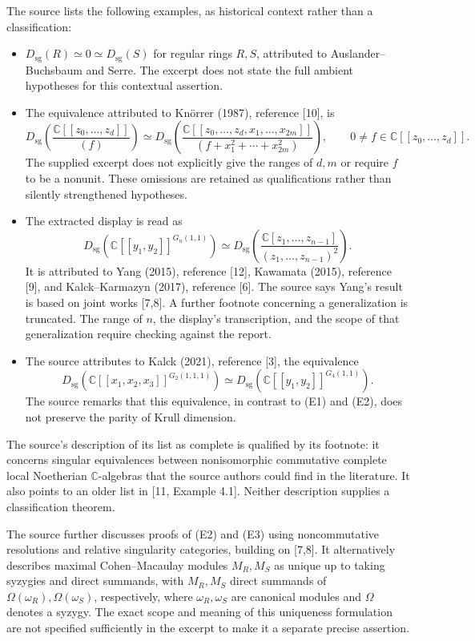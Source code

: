 \documentclass[11pt]{article}
\newcommand{\C}{\mathbb{C}}
\begin{document}
The source lists the following examples, as historical context rather than a classification:
\begin{itemize}
\item[(E0)] \(D_{\mathrm{sg}}(R)\simeq0\simeq D_{\mathrm{sg}}(S)\) for regular rings \(R,S\), attributed to Auslander--Buchsbaum and Serre. The excerpt does not state the full ambient hypotheses for this contextual assertion.
\item[(E1)] The equivalence attributed to Kn\"orrer (1987), reference [10], is
\[
D_{\mathrm{sg}}\!\left(\frac{\C[[z_0,\ldots,z_d]]}{(f)}\right)
\simeq
D_{\mathrm{sg}}\!\left(\frac{\C[[z_0,\ldots,z_d,x_1,\ldots,x_{2m}]]}{(f+x_1^2+\cdots+x_{2m}^2)}\right),
\qquad 0\ne f\in\C[[z_0,\ldots,z_d]].
\]
The supplied excerpt does not explicitly give the ranges of \(d,m\) or require \(f\) to be a nonunit. These omissions are retained as qualifications rather than silently strengthened hypotheses.
\item[(E2)] The extracted display is read as
\[
D_{\mathrm{sg}}\!\left(\C[[y_1,y_2]]^{G_n(1,1)}\right)
\simeq
D_{\mathrm{sg}}\!\left(\frac{\C[z_1,\ldots,z_{n-1}]}{(z_1,\ldots,z_{n-1})^2}\right).
\]
It is attributed to Yang (2015), reference [12], Kawamata (2015), reference [9], and Kalck--Karmazyn (2017), reference [6]. The source says Yang's result is based on joint works [7,8]. A further footnote concerning a generalization is truncated. The range of \(n\), the display's transcription, and the scope of that generalization require checking against the report.
\item[(E3)] The source attributes to Kalck (2021), reference [3], the equivalence
\[
D_{\mathrm{sg}}\!\left(\C[[x_1,x_2,x_3]]^{G_2(1,1,1)}\right)
\simeq
D_{\mathrm{sg}}\!\left(\C[[y_1,y_2]]^{G_4(1,1)}\right).
\]
The source remarks that this equivalence, in contrast to (E1) and (E2), does not preserve the parity of Krull dimension.
\end{itemize}
The source's description of its list as complete is qualified by its footnote: it concerns singular equivalences between nonisomorphic commutative complete local Noetherian \(\C\)-algebras that the source authors could find in the literature. It also points to an older list in [11, Example 4.1]. Neither description supplies a classification theorem.

The source further discusses proofs of (E2) and (E3) using noncommutative resolutions and relative singularity categories, building on [7,8]. It alternatively describes maximal Cohen--Macaulay modules \(M_R,M_S\) as unique up to taking syzygies and direct summands, with \(M_R,M_S\) direct summands of \(\Omega(\omega_R),\Omega(\omega_S)\), respectively, where \(\omega_R,\omega_S\) are canonical modules and \(\Omega\) denotes a syzygy. The exact scope and meaning of this uniqueness formulation are not specified sufficiently in the excerpt to make it a separate precise assertion.
\end{document}
